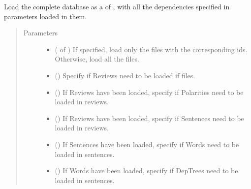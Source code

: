 \documentclass[letterpaper,10pt,english]{sphinxmanual}
\begin{document}

\begin{fulllineitems}
\label{\detokenize{load:loacore.load.file_load.load_database}}
Load the complete database as a  of {\hyperref[\detokenize{classes:loacore.classes.classes.File}]{}} , with all the dependencies specified in parameters
loaded in them.
\begin{quote}\begin{description}
\item[{Parameters}] \leavevmode\begin{itemize}
\item {} 
 ( of ) \textendash{} If specified, load only the files with the corresponding ids. Otherwise, load all the files.

\item {} 
 () \textendash{} Specify if Reviews need to be loaded if files.

\item {} 
 () \textendash{} If Reviews have been loaded, specify if Polarities need to be loaded in reviews.

\item {} 
 () \textendash{} If Reviews have been loaded, specify if Sentences need to be loaded in reviews.

\item {} 
 () \textendash{} If Sentences have been loaded, specify if Words need to be loaded in sentences.

\item {} 
 () \textendash{} If Words have been loaded, specify if DepTrees need to be loaded in sentences.


\end{itemize}
\end{description}
\end{quote}
\end{fulllineitems}
\end{document}
